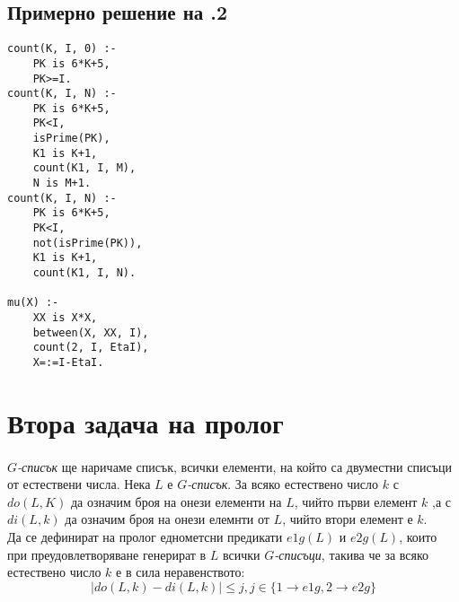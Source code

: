 \documentclass[12pt]{article}
\newenvironment{longlisting}{\captionsetup{type=listing}}{}
\begin{document}
\vskip 0.2in

\subsection{Примерно решение на .2} 
\begin{longlisting}
\begin{verbatim}
count(K, I, 0) :-
    PK is 6*K+5,
    PK>=I.
count(K, I, N) :-
    PK is 6*K+5,
    PK<I,
    isPrime(PK),
    K1 is K+1,
    count(K1, I, M),
    N is M+1.
count(K, I, N) :-
    PK is 6*K+5,
    PK<I,
    not(isPrime(PK)),
    K1 is K+1,
    count(K1, I, N).

mu(X) :-
    XX is X*X,
    between(X, XX, I),
    count(2, I, EtaI),
    X=:=I-EtaI.
\end{verbatim}
\end{longlisting}

\newpage
\section{Втора задача на пролог}

\paragraph{} 
$G$\emph{-списък} ще наричаме списък, всички елементи, на който са двуместни списъци от естествени числа. Нека $L$ е $G$\emph{-списък}. За всяко естествено число $k$ с $do(L, K)$ да означим броя на онези елементи на $L$, чийто първи елемент $k$ ,а с $di(L,k)$  да означим броя на онези елемнти от $L$, чийто втори елемент е $k$.\\
Да се дефинират на пролог еднометсни предикати $e1g(L)$ и $e2g(L)$, които при преудовлетворяване генерират в $L$ всички $G$\emph{-списъци}, такива че за всяко естествено число $k$ е в сила неравенството:
\begin{equation*}
    |do(L,k) - di(L, k)| \leq j, j \in \{1 \rightarrow e1g,2 \rightarrow e2g\}
\end{equation*}
\end{document}
